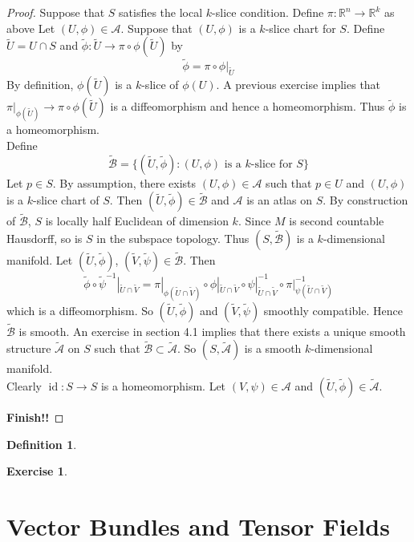 \documentclass[12pt]{amsart}
\theoremstyle{definition}
\newtheorem{defn}[definition]{Definition}
\newtheorem{ex}[definition]{Exercise}
\newcommand{\R}{\mathbb{R}}
\newcommand{\MA}{\mathcal{A}}
\newcommand{\MB}{\mathcal{B}}
\newcommand{\tMA}{\tilde{\MA}}
\newcommand{\tMB}{\tilde{\MB}}
\newcommand{\tU}{\tilde{U}}
\newcommand{\tV}{\tilde{V}}
\newcommand{\tphi}{\tilde{\phi}}
\newcommand{\tpsi}{\tilde{\psi}}
\DeclareMathOperator{\id}{id}
\begin{document}
	\begin{proof}
	Suppose that $S$ satisfies the local $k$-slice condition. Define $\pi: \R^n \rightarrow \R^k$ as above Let $(U, \phi) \in \MA$. Suppose that $(U, \phi)$ is a $k$-slice chart for $S$. Define $\tU = U \cap S$ and $\tphi: \tU \rightarrow \pi \circ \phi(\tU)$ by $$\tphi = \pi \circ \phi|_{\tU}$$ By definition, $\phi(\tU)$ is a $k$-slice of $\phi(U)$. A previous exercise implies that $\pi|_{\phi(\tU)} \rightarrow \pi \circ \phi(\tU)$ is a diffeomorphism and hence a homeomorphism. Thus $\tphi$ is a homeomorphism.\\
	Define $$\tMB = \{(\tU, \tphi): (U, \phi) \text{ is a $k$-slice for $S$} \}$$
	Let $p \in S$. By assumption, there exists $(U, \phi) \in \MA$ such that $p \in U$ and $(U, \phi)$ is a $k$-slice chart of $S$. Then $(\tU, \tphi) \in \tMB$ and $\MA$ is an atlas on $S$. By construction of $\tMB$, $S$ is locally half Euclidean of dimension $k$.  Since $M$ is second countable Hausdorff, so is $S$ in the subspace topology. Thus $(S, \tMB)$ is a $k$-dimensional manifold.
	Let $(\tU, \tphi)$, $(\tV, \tpsi) \in \tMB$. Then
	$$\tphi \circ \tpsi^{-1}|_{\tU \cap \tV} = \pi|_{\phi(\tU \cap \tV)} \circ \phi|_{\tU \cap \tV} \circ \psi|_{\tU \cap \tV}^{-1} \circ \pi|_{\psi(\tU \cap \tV)}^{-1} $$
	which is a diffeomorphism. So $(\tU, \tphi)$ and $(\tV, \tpsi)$ smoothly compatible. Hence $\tMB$ is smooth. An exercise in section 4.1 implies that there exists a unique smooth structure $\tMA$ on $S$ such that $\tMB \subset \tMA$. So $(S, \tMA)$ is a smooth $k$-dimensional manifold.\\
	Clearly $\id: S \rightarrow S$ is a homeomorphism. Let $(V, \psi) \in \MA$ and $(\tU, \tphi) \in \tMA$. 
	
	\textbf{Finish!!}
	\end{proof}
	
	
	
	
	\begin{defn}
	
	\end{defn}	
	
	\begin{ex}
	
	\end{ex}	
	
	
	
	
	
	
	
	
	

	
	\newpage
	\section{Vector Bundles and Tensor Fields}
	
\end{document}
